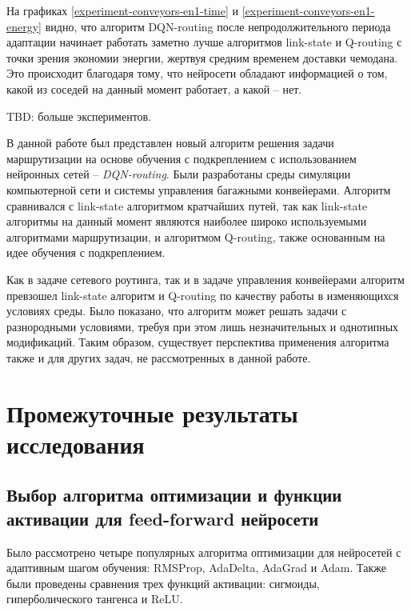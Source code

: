 \documentclass[specification, annotation]{itmo-student-thesis}
\begin{document}
На графиках \ref{experiment-conveyors-en1-time} и
\ref{experiment-conveyors-en1-energy} видно, что алгоритм DQN-routing после
непродолжительного периода адаптации начинает работать заметно лучше алгоритмов
link-state и Q-routing с точки зрения экономии энергии, жертвуя средним временем
доставки чемодана. Это происходит благодаря тому, что нейросети обладают
информацией о том, какой из соседей на данный момент работает, а какой -- нет.

TBD: больше экспериментов.

\startconclusionpage

В данной работе был представлен новый алгоритм решения задачи маршрутизации на основе
обучения с подкреплением с использованием нейронных сетей --
\textit{DQN-routing}. Были разработаны среды симуляции компьютерной сети и
системы управления багажными конвейерами. Алгоритм сравнивался с link-state
алгоритмом кратчайших путей, так как link-state алгоритмы на данный момент
являются наиболее широко используемыми алгоритмами маршрутизации, и алгоритмом
Q-routing, также основанным на идее обучения с подкреплением.

Как в задаче сетевого роутинга, так и в задаче управления конвейерами алгоритм
превзошел link-state алгоритм и Q-routing по качеству работы в изменяющихся
условиях среды. Было показано, что алгоритм может решать задачи с разнородными
условиями, требуя при этом лишь незначительных и однотипных модификаций.
Таким образом, существует перспектива применения алгоритма также и для других
задач, не рассмотренных в данной работе.

\printmainbibliography

\appendix

\chapter{Промежуточные результаты исследования}

\section{Выбор алгоритма оптимизации и функции активации для feed-forward нейросети}\label{apx:optimizers}

Было рассмотрено четыре популярных алгоритма оптимизации для нейросетей с адаптивным
шагом обучения: RMSProp\cite{tieleman2012lecture},
AdaDelta\cite{zeiler2012adadelta}, AdaGrad\cite{duchi2011adaptive} и
Adam\cite{kingma2014adam}. Также были проведены сравнения трех функций
активации: сигмоиды, гиперболического тангенса и ReLU.
\end{document}
